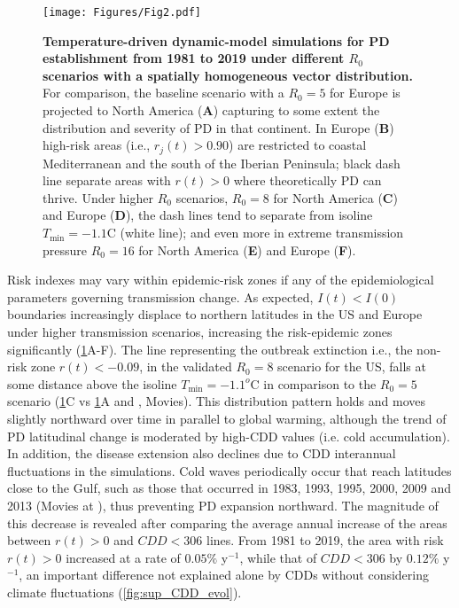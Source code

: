     \begin{figure}[H]
        \centering
        \texttt{[image: Figures/Fig2.pdf]}
        \caption{\textbf{Temperature-driven dynamic-model simulations  for PD
                establishment from 1981 to 2019 under different $R_0$ scenarios
                with a
                spatially homogeneous vector distribution.} For comparison, the
            baseline
            scenario with a $R_0=5$ for Europe is projected to North America
            (\textbf{A})
            capturing to some extent the distribution and severity of PD in
            that continent.
            In Europe (\textbf{B}) high-risk areas (i.e., $r_j(t) > 0.90$) are
            restricted
            to coastal Mediterranean and the south of the Iberian Peninsula;
            black dash
            line separate areas with $r(t)>0$ where theoretically PD can
            thrive. Under
            higher $R_0$ scenarios, $R_0=8$ for North America (\textbf{C}) and
            Europe
            (\textbf{D}), the dash lines tend to separate from isoline
            $T_{\textrm{min}} =
                -1.1$\textdegree C (white line); and even more in extreme
            transmission pressure
            $R_0=16$ for North America (\textbf{E}) and Europe (\textbf{F}). }
        \label{fig4}
    \end{figure}

    Risk indexes may vary within epidemic-risk zones if any of the
    epidemiological
    parameters governing transmission change. As expected, $I(t) < I(0)$
    boundaries
    increasingly displace to northern latitudes in the US and Europe under
    higher
    transmission scenarios, increasing the risk-epidemic zones significantly
    (\cref{fig4}A-F). The line representing the outbreak extinction i.e., the
    non-risk zone $r(t)<-0.09$, in the validated $R_0=8$ scenario for the US,
    falls
    at some distance above the isoline $T_{\textrm{min}} = -1.1^o$C in
    comparison
    to the $R_0=5$ scenario (\cref{fig4}C vs \cref{fig4}A and \cite{Webpage},
    Movies). This distribution pattern holds and moves slightly northward over
    time
    in parallel to global warming, although the trend of PD latitudinal change
    is
    moderated by high-CDD values (i.e. cold accumulation). In addition, the
    disease
    extension also declines due to CDD interannual fluctuations in the
    simulations.
    Cold waves periodically occur that reach latitudes close to the Gulf, such
    as
    those that occurred in 1983, 1993, 1995, 2000, 2009 and 2013 (Movies at
    \cite{Webpage}), thus preventing PD expansion northward. The magnitude of
    this
    decrease is revealed after comparing the average annual increase of the
    areas
    between $r(t) > 0$ and $CDD < 306$ lines. From 1981 to 2019, the area with
    risk
$r(t) > 0$ increased at a rate of $0.05\%$ y$^{-1}$, while that of $CDD < 306$
    by $0.12\%$ y$^{-1}$, an important difference not explained alone by CDDs
    without considering climate fluctuations (\cref{fig:sup_CDD_evol}).

